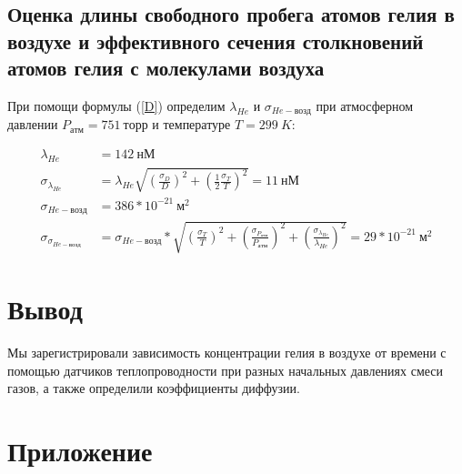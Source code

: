 \documentclass[a4paper, 12pt]{article}
\begin{document}
    \subsection{Оценка длины свободного пробега атомов гелия в воздухе и эффективного сечения столкновений атомов гелия с молекулами воздуха}

        При помощи формулы (\ref{D}) определим $\lambda_{He}$ и $\sigma_{He-возд}$ при атмосферном давлении $P_{атм} = 751~торр$ и температуре $T = 299~K$:

        \begin{align*}
            \lambda_{He} &= 142~нМ\\
            \sigma_{\lambda_{He}} &= \lambda_{He} \sqrt{\left( \frac{\sigma_D}{D} \right)^2 + \left( \frac{1}{2} \frac{\sigma_T}{T} \right)^2} = 11~нМ\\
            \sigma_{He-возд} &= 386 * 10^{-21}~м^2\\
            \sigma_{\sigma_{He-возд}} &= \sigma_{He-возд} * \sqrt{\left( \frac{\sigma_T}{T} \right)^2 + \left( \frac{\sigma_{P_{атм}}}{P_{атм}} \right)^2 + \left( \frac{\sigma_{\lambda_{He}}}{\lambda_{He}} \right)^2} = 29 * 10^{-21}~м^2
        \end{align*}

    \section{Вывод}

        Мы зарегистрировали зависимость концентрации гелия в воздухе от времени с помощью датчиков теплопроводности при разных начальных давлениях смеси газов, а также определили коэффициенты диффузии.

    \section{Приложение}
\end{document}
